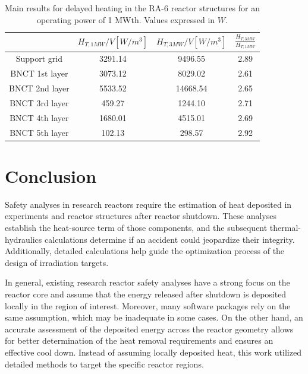 \documentclass{style/nseJournal}
\begin{document}
\begin{table}[htbp!]
  \centering
  \caption{Main results for delayed heating in the RA-6 reactor structures for an operating power of 1 MWth. Values expressed in $W$.}
  \label{tab:ra6-res}
  \begin{tabular}{cccc}
    \toprule

                    & $H_{T, 1MW}/V [W/m^3]$  & $H_{T, 3MW}/V [W/m^3]$  & $ \frac{H_{T, 3MW}}{H_{T, 1MW}} $  \\
    \midrule
    Support grid    &  3291.14                &  9496.55                &  2.89    \\
    BNCT 1st layer  &  3073.12                &  8029.02                &  2.61    \\
    BNCT 2nd layer  &  5533.52                & 14668.54                &  2.65    \\
    BNCT 3rd layer  &   459.27                &  1244.10                &  2.71    \\
    BNCT 4th layer  &  1680.01                &  4515.01                &  2.69    \\
    BNCT 5th layer  &   102.13                &  298.57                 &  2.92    \\
    \bottomrule
  \end{tabular}
\end{table}


\section{Conclusion}
\label{sec:conclusion}

Safety analyses in research reactors require the estimation of heat deposited in experiments and reactor structures after reactor shutdown.
These analyses establish the heat-source term of those components, and the subsequent thermal-hydraulics calculations determine if an accident could jeopardize their integrity.
Additionally, detailed calculations help guide the optimization process of the design of irradiation targets.

In general, existing research reactor safety analyses have a strong focus on the reactor core and assume that the energy released after shutdown is deposited locally in the region of interest.
Moreover, many software packages rely on the same assumption, which may be inadequate in some cases.
On the other hand, an accurate assessment of the deposited energy across the reactor geometry allows for better determination of the heat removal requirements and ensures an effective cool down.
Instead of assuming locally deposited heat, this work utilized detailed methods to target the specific reactor regions.
\end{document}
